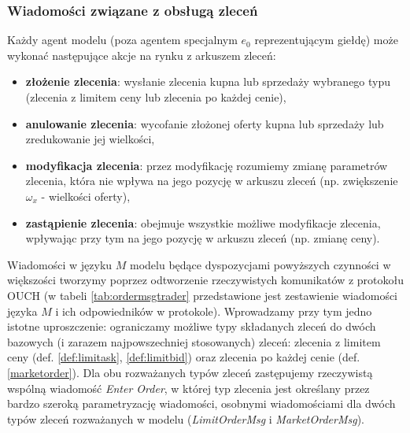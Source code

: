 \subsubsection{Wiadomości związane z obsługą zleceń}\label{sec:orderexecmsg}
Każdy agent modelu (poza agentem specjalnym $e_0$ reprezentującym giełdę) może wykonać następujące akcje na rynku z arkuszem zleceń:
\begin{itemize}
\item \textbf{złożenie zlecenia}: wysłanie zlecenia kupna lub sprzedaży wybranego typu (zlecenia z limitem ceny lub zlecenia po każdej cenie),
\item \textbf{anulowanie zlecenia}: wycofanie złożonej oferty kupna lub sprzedaży lub zredukowanie jej wielkości,
\item \textbf{modyfikacja zlecenia}: przez modyfikację rozumiemy zmianę parametrów zlecenia, która nie wpływa na jego pozycję w arkuszu zleceń (np. zwiększenie $\omega_x$ - wielkości oferty), 
\item \textbf{zastąpienie zlecenia}: obejmuje wszystkie możliwe modyfikacje zlecenia, wpływając przy tym na jego pozycję w arkuszu zleceń (np. zmianę ceny).
\end{itemize}
Wiadomości w języku $M$ modelu będące dyspozycjami powyższych czynności w większości tworzymy poprzez odtworzenie rzeczywistych komunikatów z protokołu OUCH (w tabeli \ref{tab:ordermsgtrader} przedstawione jest zestawienie wiadomości języka $M$ i ich odpowiedników w protokole). Wprowadzamy przy tym jedno istotne uproszczenie: ograniczamy możliwe typy składanych zleceń do dwóch bazowych (i zarazem najpowszechniej stosowanych) zleceń: zlecenia z limitem ceny (def. \ref{def:limitask}, \ref{def:limitbid}) oraz zlecenia po każdej cenie (def. \ref{marketorder}). Dla obu rozważanych typów zleceń zastępujemy rzeczywistą wspólną wiadomość \textit{Enter Order}, w której typ zlecenia jest określany przez bardzo szeroką parametryzację wiadomości, osobnymi wiadomościami dla dwóch typów zleceń rozważanych w modelu (\textit{LimitOrderMsg} i \textit{MarketOrderMsg}).
